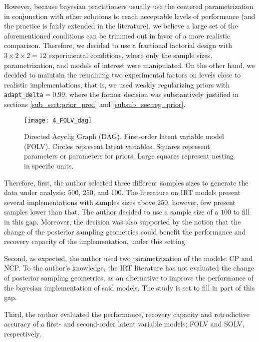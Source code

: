 However, because bayesian practitioners usually use the centered parametrization in conjunction with other solutions to reach acceptable levels of performance (and the practice is fairly extended in the literature), we believe a large set of the aforementioned conditions can be trimmed out in favor of a more realistic comparison. Therefore, we decided to use a fractional factorial design with $3 \times 2 \times 2 = 12$ experimental conditions, where only the sample sizes, parametrization, and models of interest were manipulated. On the other hand, we decided to maintain the remaining two experimental factors on levels close to realistic implementations, that is, we used weakly regularizing priors with \texttt{adapt\_delta}$=0.99$, where the former decision was substantively justified in sections \ref{sub_sect:prior_pred} and \ref{subsub_sec:reg_prior}.
%
\begin{figure}[H]
	\centering
	\texttt{[image: 4\_FOLV\_dag]}
	\caption[Directed Acyclig Graph (DAG). First-order latent variable model (FOLV).]%
	{Directed Acyclig Graph (DAG). First-order latent variable model (FOLV). Circles represent latent variables. Squares represent parameters or parameters for priors. Large squares represent nesting in specific units.}
	\label{fig:FOLV_model}
\end{figure}

Therefore, first, the author selected three different samples sizes to generate the data under analysis: $500$, $250$, and $100$. The literature on IRT models present several implementations with samples sizes above $250$, however, few present samples lower than that. The author decided to use a sample size of a $100$ to fill in this gap. Moreover, the decision was also supported by the notion that the change of the posterior sampling geometries could benefit the performance and recovery capacity of the implementation, under this setting.

Second, as expected, the author used two parametrization of the models: CP and NCP. To the author's knowledge, the IRT literature has not evaluated the change of posterior sampling geometries, as an alternative to improve the performance of the bayesian implementation of said models. The study is set to fill in part of this gap.

Third, the author evaluated the performance, recovery capacity and retrodictive accuracy of a first- and second-order latent variable models; FOLV and SOLV, respectively.

